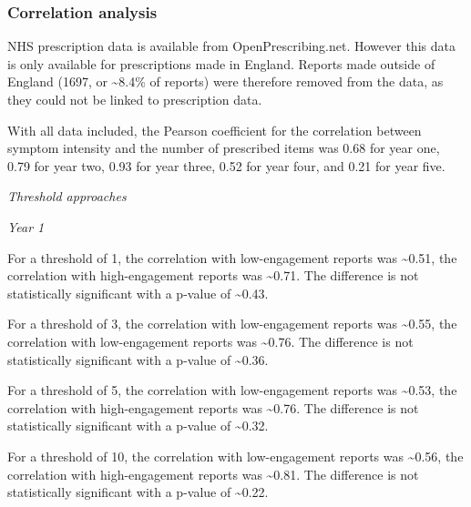 \documentclass[
]{article}
\begin{document}
\hypertarget{correlation-analysis}{%
\subsubsection{Correlation analysis}\label{correlation-analysis}}

NHS prescription data is available from OpenPrescribing.net. However
this data is only available for prescriptions made in England. Reports
made outside of England (1697, or \textasciitilde8.4\% of reports) were
therefore removed from the data, as they could not be linked to
prescription data.

With all data included, the Pearson coefficient for the correlation
between symptom intensity and the number of prescribed items was 0.68
for year one, 0.79 for year two, 0.93 for year three, 0.52 for year
four, and 0.21 for year five.

\emph{Threshold approaches}

\emph{Year 1}

For a threshold of 1, the correlation with low-engagement reports was
\textasciitilde0.51, the correlation with high-engagement reports was
\textasciitilde0.71. The difference is not statistically significant
with a p-value of \textasciitilde0.43.

For a threshold of 3, the correlation with low-engagement reports was
\textasciitilde0.55, the correlation with low-engagement reports was
\textasciitilde0.76. The difference is not statistically significant
with a p-value of \textasciitilde0.36.

For a threshold of 5, the correlation with low-engagement reports was
\textasciitilde0.53, the correlation with high-engagement reports was
\textasciitilde0.76. The difference is not statistically significant
with a p-value of \textasciitilde0.32.

For a threshold of 10, the correlation with low-engagement reports was
\textasciitilde0.56, the correlation with high-engagement reports was
\textasciitilde0.81. The difference is not statistically significant
with a p-value of \textasciitilde0.22.
\end{document}
